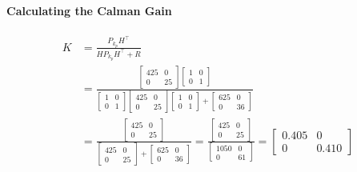 \paragraph{Calculating the Calman Gain}
$$
\begin{aligned}
K &=\frac{P_{k_p} H^{\top}}{H P_{k_p} H^{\top}+R} \\
&=\frac{\left[\begin{array}{cc}
425 & 0 \\
0 & 25
\end{array}\right]\left[\begin{array}{ll}
1 & 0 \\
0 & 1
\end{array}\right]}{\left[\begin{array}{ll}
1 & 0 \\
0 & 1
\end{array}\right]\left[\begin{array}{cc}
425 & 0 \\
0 & 25
\end{array}\right]\left[\begin{array}{ll}
1 & 0 \\
0 & 1
\end{array}\right]+\left[\begin{array}{cc}
625 & 0 \\
0 & 36
\end{array}\right]} \\
&=\frac{\left[\begin{array}{cc}
425 & 0 \\
0 & 25
\end{array}\right]}{\left[\begin{array}{cc}
425 & 0 \\
0 & 25
\end{array}\right]+\left[\begin{array}{cc}
625 & 0 \\
0 & 36
\end{array}\right]}=\frac{\left[\begin{array}{cc}
425 & 0 \\
0 & 25
\end{array}\right]}{\left[\begin{array}{cc}
1050 & 0 \\
0 & 61
\end{array}\right]}=\left[\begin{array}{cc}
0.405 & 0 \\
0 & 0.410
\end{array}\right]
\end{aligned}
$$
